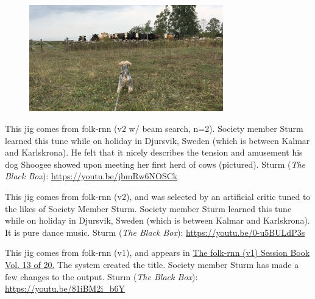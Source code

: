 \documentclass[a4paper,notitlepage,twoside]{book}
\begin{document}
{}  
\hypertarget{jig:ShoogeeCows}{}
\begin{figure}
\vspace{-0.2in}
\includegraphics[width=0.75\textwidth]{ShoogeeCows.png}
\end{figure}
This jig comes from folk-rnn (v2 w/ beam search, n=2).
Society member Sturm learned this tune while on holiday
in Djursvik, Sweden (which is between Kalmar and Karlskrona).
He felt that it nicely describes the tension and amusement his dog Shoogee 
showed upon meeting her first herd of cows (pictured). 
Sturm ({\em The Black Box}): \url{https://youtu.be/jbmRw6NOSCk}

\clearpage
{}
{}  
\hypertarget{jig:DjursvikSemester}{}
This jig comes from folk-rnn (v2), and was selected by an artificial critic 
tuned to the likes of Society Member Sturm.
Society member Sturm learned this tune while on holiday
in Djursvik, Sweden (which is between Kalmar and Karlskrona).
It is pure dance music.
Sturm ({\em The Black Box}): \url{https://youtu.be/0-u5BULdP3s}

{}  
\hypertarget{jig:IrishShown}{}
This jig comes from folk-rnn (v1), and appears in 
\href{https://highnoongmt.wordpress.com/2018/01/05/volumes-1-20-of-folk-rnn-v1-transcriptions}{The folk-rnn (v1) Session Book Vol. 13 of 20.}
The system created the title.
Society member Sturm has made a few changes to the output.
Sturm ({\em The Black Box}): \url{https://youtu.be/81iBM2i_b6Y}
\end{document}
